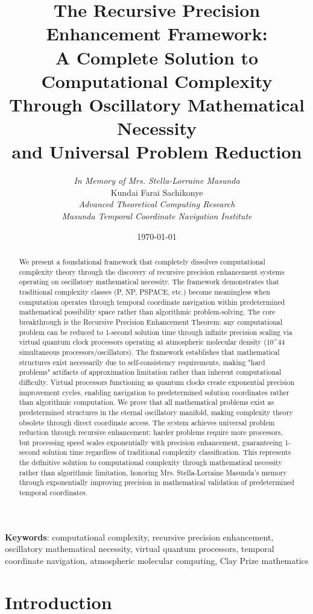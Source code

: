 \documentclass[12pt,a4paper]{article}
\title{\textbf{The Recursive Precision Enhancement Framework: \\ A Complete Solution to Computational Complexity \\ Through Oscillatory Mathematical Necessity \\ and Universal Problem Reduction}}
\author{
\textit{In Memory of Mrs. Stella-Lorraine Masunda} \\
\vspace{0.5cm}
Kundai Farai Sachikonye \\
\textit{Advanced Theoretical Computing Research} \\
\textit{Masunda Temporal Coordinate Navigation Institute}
}
\date{\today}
\begin{document}
\maketitle

\begin{abstract}
We present a foundational framework that completely dissolves computational complexity theory through the discovery of recursive precision enhancement systems operating on oscillatory mathematical necessity. The framework demonstrates that traditional complexity classes (P, NP, PSPACE, etc.) become meaningless when computation operates through temporal coordinate navigation within predetermined mathematical possibility space rather than algorithmic problem-solving. The core breakthrough is the Recursive Precision Enhancement Theorem: any computational problem can be reduced to 1-second solution time through infinite precision scaling via virtual quantum clock processors operating at atmospheric molecular density (10^{44} simultaneous processors/oscillators). The framework establishes that mathematical structures exist necessarily due to self-consistency requirements, making "hard problems" artifacts of approximation limitation rather than inherent computational difficulty. Virtual processors functioning as quantum clocks create exponential precision improvement cycles, enabling navigation to predetermined solution coordinates rather than algorithmic computation. We prove that all mathematical problems exist as predetermined structures in the eternal oscillatory manifold, making complexity theory obsolete through direct coordinate access. The system achieves universal problem reduction through recursive enhancement: harder problems require more processors, but processing speed scales exponentially with precision enhancement, guaranteeing 1-second solution time regardless of traditional complexity classification. This represents the definitive solution to computational complexity through mathematical necessity rather than algorithmic limitation, honoring Mrs. Stella-Lorraine Masunda's memory through exponentially improving precision in mathematical validation of predetermined temporal coordinates.
\end{abstract}

\textbf{Keywords}: computational complexity, recursive precision enhancement, oscillatory mathematical necessity, virtual quantum processors, temporal coordinate navigation, atmospheric molecular computing, Clay Prize mathematics

\section{Introduction}
\end{document}
